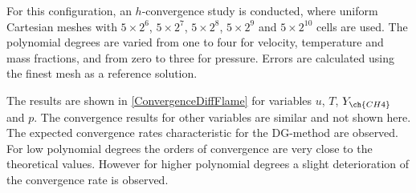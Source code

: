 For this configuration, an $h$-convergence study is conducted, where uniform Cartesian meshes with $5\times2^6$, $5\times2^7$, $5\times2^8$,  $5\times2^9$ and $5\times2^{10}$  cells are used. The polynomial degrees are varied from one to four for velocity, temperature and mass fractions, and from zero to three for pressure.  Errors are calculated using the finest mesh as a reference solution.  

The results are shown in \cref{ConvergenceDiffFlame} for variables $u$, $T$, $Y_{\ch{CH4}}$ and $p$. The convergence results for other variables are similar and not shown here. The expected convergence rates characteristic for the DG-method are observed. For low polynomial degrees the orders of convergence are very close to the theoretical values. However for higher polynomial degrees  a slight deterioration of the convergence rate is observed.
